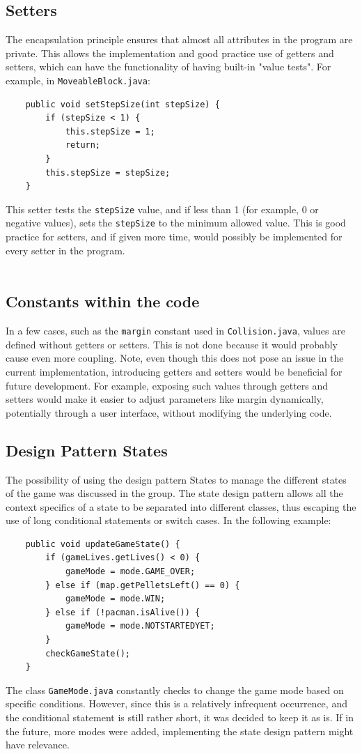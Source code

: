 \documentclass[a4paper,5pt]{article}
\begin{document}
\subsection{Setters}
The encapsulation principle ensures that almost all attributes in the program are private. This allows the implementation and good practice use of getters and setters, which can have the functionality of having built-in "value tests". For example, in \texttt{MoveableBlock.java}:
\begin{verbatim}
    public void setStepSize(int stepSize) {
        if (stepSize < 1) {
            this.stepSize = 1;
            return;
        }
        this.stepSize = stepSize;
    }
\end{verbatim}
This setter tests the \texttt{stepSize} value, and if less than 1 (for example, 0 or negative values), sets the \texttt{stepSize} to the minimum allowed value. This is good practice for setters, and if given more time, would possibly be implemented for every setter in the program. \\\\

\subsection{Constants within the code}
In a few cases, such as the \texttt{margin} constant used in \texttt{Collision.java}, values are defined without getters or setters. This is not done because it would probably cause even more coupling. Note, even though this does not pose an issue in the current implementation, introducing getters and setters would be beneficial for future development. For example, exposing such values through getters and setters would make it easier to adjust parameters like margin dynamically,  potentially through a user interface, without modifying the underlying code.

\newpage
\subsection{Design Pattern States}
The possibility of using the design pattern States to manage the different states of the game was discussed in the group. The state design pattern allows all the context specifics of a state to be separated into different classes, thus escaping the use of long conditional statements or switch cases. In the following example:
\begin{verbatim}
    public void updateGameState() {
        if (gameLives.getLives() < 0) {
            gameMode = mode.GAME_OVER;
        } else if (map.getPelletsLeft() == 0) {
            gameMode = mode.WIN;
        } else if (!pacman.isAlive()) {
            gameMode = mode.NOTSTARTEDYET;            
        }
        checkGameState();
    }
\end{verbatim}
The class \texttt{GameMode.java} constantly checks to change the game mode based on specific conditions. However, since this is a relatively infrequent occurrence, and the conditional statement is still rather short, it was decided to keep it as is. If in the future, more modes were added, implementing the state design pattern might have relevance.
\end{document}
